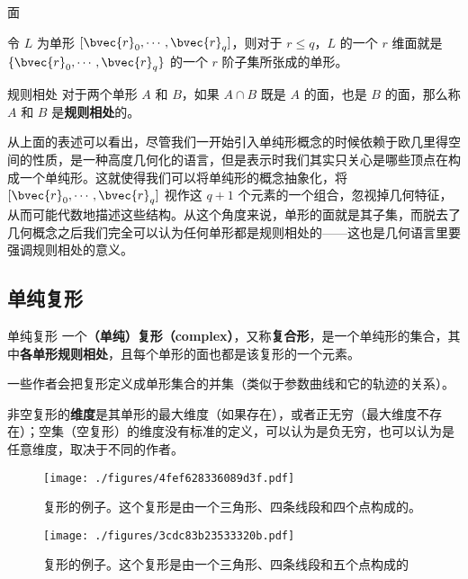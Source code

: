 \begin{definition}{面}

令 $L$ 为单形 $[\bvec{r}_0, \cdots, \bvec{r}_q]$，则对于 $r\leq q$，$L$ 的一个 $r$ 维面就是 $\{\bvec{r}_0, \cdots, \bvec{r}_q\}$ 的一个 $r$ 阶子集所张成的单形。

\end{definition}


\begin{definition}{规则相处}
对于两个单形 $A$ 和 $B$，如果 $A\cap B$ 既是 $A$ 的面，也是 $B$ 的面，那么称 $A$ 和 $B$ 是\textbf{规则相处}的。
\end{definition}


从上面的表述可以看出，尽管我们一开始引入单纯形概念的时候依赖于欧几里得空间的性质，是一种高度几何化的语言，但是表示时我们其实只关心是哪些顶点在构成一个单纯形。这就使得我们可以将单纯形的概念抽象化，将 $[\bvec{r}_0, \cdots, \bvec{r}_q]$ 视作这 $q+1$ 个元素的一个组合，忽视掉几何特征，从而可能代数地描述这些结构。从这个角度来说，单形的面就是其子集，而脱去了几何概念之后我们完全可以认为任何单形都是规则相处的——这也是几何语言里要强调规则相处的意义。

\subsection{单纯复形}

\begin{definition}{单纯复形}
一个\textbf{（单纯）复形（complex）}，又称\textbf{复合形}，是一个单纯形的集合，其中\textbf{各单形规则相处}，且每个单形的面也都是该复形的一个元素。

一些作者会把复形定义成单形集合的并集（类似于参数曲线和它的轨迹的关系）。

非空复形的\textbf{维度}是其单形的最大维度（如果存在），或者正无穷（最大维度不存在）；空集（空复形）的维度没有标准的定义，可以认为是负无穷，也可以认为是任意维度，取决于不同的作者。
\end{definition}

\begin{figure}[ht]
\centering
\texttt{[image: ./figures/4fef628336089d3f.pdf]}
\caption{复形的例子。这个复形是由一个三角形、四条线段和四个点构成的。} \label{fig_SimCom_1}
\end{figure}

\begin{figure}[ht]
\centering
\texttt{[image: ./figures/3cdc83b23533320b.pdf]}
\caption{复形的例子。这个复形是由一个三角形、四条线段和五个点构成的} \label{fig_SimCom_2}
\end{figure}


